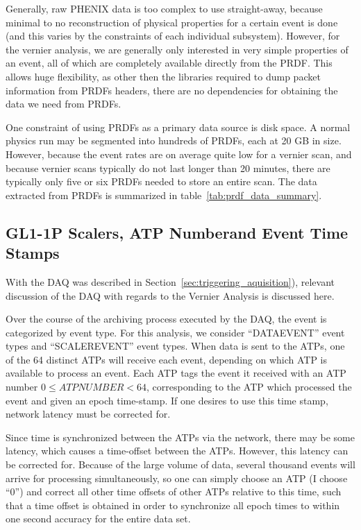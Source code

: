 Generally, raw PHENIX data is too complex to use straight-away, because minimal
to no reconstruction of physical properties for a certain event is done (and
this varies by the constraints of each individual subsystem).  However, for the
vernier analysis, we are generally only interested in very simple properties of
an event, all of which are completely available directly from the PRDF. This
allows huge flexibility, as other then the libraries required to dump packet
information from PRDFs headers, there are no dependencies for obtaining the data
we need from PRDFs.

One constraint of using PRDFs as a primary data source is disk space. A normal
physics run may be segmented into hundreds of PRDFs, each at 20 GB in size.
However, because the event rates are on average quite low for a vernier scan,
and because vernier scans typically do not last longer than 20 minutes, there
are typically only five or six PRDFs needed to store an entire scan. The data
extracted from PRDFs is summarized in table~\ref{tab:prdf_data_summary}.

\subsection{GL1-1P Scalers, ATP Numberand Event Time Stamps}

With the DAQ was described in Section~\ref{sec:triggering_aquisition}),
relevant discussion of the DAQ with regards to the Vernier Analysis is discussed
here.

Over the course of the archiving process executed by the DAQ, the event is
categorized by event type.  For this analysis, we consider ``DATAEVENT'' event
types and ``SCALEREVENT'' event types. When data is sent to the ATPs, one of the
64 distinct ATPs will receive each event, depending on which ATP is available to
process an event. Each ATP tags the event it received with an ATP number $0 \leq
ATPNUMBER < 64$, corresponding to the ATP which processed the event and given an
epoch time-stamp. If one desires to use this time stamp, network latency must be
corrected for.

Since time is synchronized between the ATPs via the network, there may be some
latency, which causes a time-offset between the ATPs. However, this latency can
be corrected for.  Because of the large volume of data, several thousand events
will arrive for processing simultaneously, so one can simply choose an ATP (I
choose ``0'') and correct all other time offsets of other ATPs relative to this
time, such that a time offset is obtained in order to synchronize all epoch
times to within one second accuracy for the entire data set.

